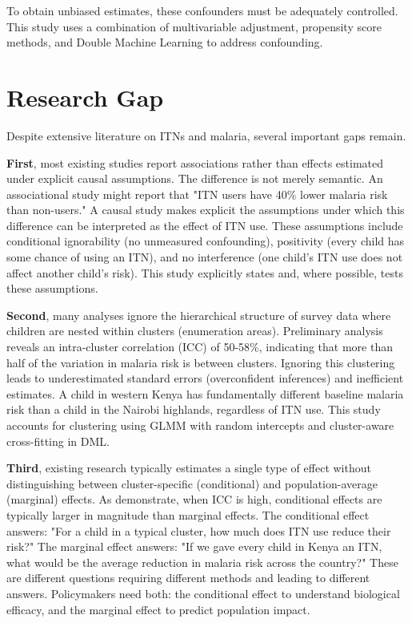 To obtain unbiased estimates, these confounders must be adequately controlled. This study uses a combination of multivariable adjustment, propensity score methods, and Double Machine Learning to address confounding.

\section{Research Gap}

Despite extensive literature on ITNs and malaria, several important gaps remain.

\textbf{First}, most existing studies report associations rather than effects estimated under explicit causal assumptions. The difference is not merely semantic. An associational study might report that "ITN users have 40\% lower malaria risk than non-users." A causal study makes explicit the assumptions under which this difference can be interpreted as the effect of ITN use. These assumptions include conditional ignorability (no unmeasured confounding), positivity (every child has some chance of using an ITN), and no interference (one child's ITN use does not affect another child's risk). This study explicitly states and, where possible, tests these assumptions.

\textbf{Second}, many analyses ignore the hierarchical structure of survey data where children are nested within clusters (enumeration areas). Preliminary analysis reveals an intra-cluster correlation (ICC) of 50-58\%, indicating that more than half of the variation in malaria risk is between clusters. Ignoring this clustering leads to underestimated standard errors (overconfident inferences) and inefficient estimates. A child in western Kenya has fundamentally different baseline malaria risk than a child in the Nairobi highlands, regardless of ITN use. This study accounts for clustering using GLMM with random intercepts and cluster-aware cross-fitting in DML.

\textbf{Third}, existing research typically estimates a single type of effect without distinguishing between cluster-specific (conditional) and population-average (marginal) effects. As \citet{neuhaus1991comparison} demonstrate, when ICC is high, conditional effects are typically larger in magnitude than marginal effects. The conditional effect answers: "For a child in a typical cluster, how much does ITN use reduce their risk?" The marginal effect answers: "If we gave every child in Kenya an ITN, what would be the average reduction in malaria risk across the country?" These are different questions requiring different methods and leading to different answers. Policymakers need both: the conditional effect to understand biological efficacy, and the marginal effect to predict population impact.


